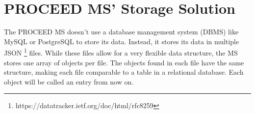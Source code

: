%
%
%
%

\section{PROCEED MS' Storage Solution}
\label{cha:relatedwork:proceed-storage}

The PROCEED MS doesn't use a database management system (DBMS) like MySQL or PostgreSQL to store its data.
Instead, it stores its data in multiple
JSON \footnote{https://datatracker.ietf.org/doc/html/rfc8259} files.
While these files allow for a very flexible data structure, the MS stores one array of
objects per file.
The objects found in each file have the same structure, 
making each file comparable to a table in a relational database.
Each object will be called an entry from now on.

